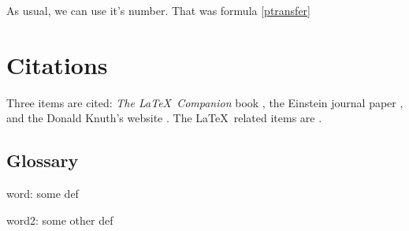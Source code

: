 \documentclass[12pt]{article}
\begin{document}
	As usual, we can use it's number. That was formula \eqref{ptransfer}

	\section{Citations}

	Three items are cited: \textit{The \LaTeX\ Companion} book \cite{latexcompanion}, the Einstein journal paper \cite{einstein}, and the Donald Knuth's website \cite{knuthwebsite}. The \LaTeX\ related items are \cite{latexcompanion,knuthwebsite}.

	\newpage
	\startappendixtitles
	\begin{appendices}

	\section{Glossary}
	\stopindent
	word: some def

	word2: some other def

	\startindent
	\end{appendices}
	\finishappendixtitles

\end{document}
